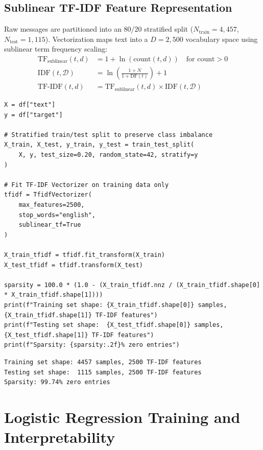 \documentclass[12pt]{article}
\begin{document}
\subsection{Sublinear TF-IDF Feature Representation}
Raw messages are partitioned into an 80/20 stratified split ($N_{\text{train}} = 4,457$, $N_{\text{test}} = 1,115$). Vectorization maps text into a $D = 2,500$ vocabulary space using sublinear term frequency scaling:
\begin{align}
    \text{TF}_{\text{sublinear}}(t, d) &= 1 + \ln(\text{count}(t, d)) \quad \text{for } \text{count} > 0 \\
    \text{IDF}(t, \mathcal{D}) &= \ln\left( \frac{1 + N}{1 + \text{DF}(t)} \right) + 1 \\
    \text{TF-IDF}(t, d) &= \text{TF}_{\text{sublinear}}(t, d) \times \text{IDF}(t, \mathcal{D})
\end{align}

\begin{lstlisting}[style=code]
X = df["text"]
y = df["target"]

# Stratified train/test split to preserve class imbalance
X_train, X_test, y_train, y_test = train_test_split(
    X, y, test_size=0.20, random_state=42, stratify=y
)

# Fit TF-IDF Vectorizer on training data only
tfidf = TfidfVectorizer(
    max_features=2500,
    stop_words="english",
    sublinear_tf=True
)

X_train_tfidf = tfidf.fit_transform(X_train)
X_test_tfidf = tfidf.transform(X_test)

sparsity = 100.0 * (1.0 - (X_train_tfidf.nnz / (X_train_tfidf.shape[0] * X_train_tfidf.shape[1])))
print(f"Training set shape: {X_train_tfidf.shape[0]} samples, {X_train_tfidf.shape[1]} TF-IDF features")
print(f"Testing set shape:  {X_test_tfidf.shape[0]} samples, {X_test_tfidf.shape[1]} TF-IDF features")
print(f"Sparsity: {sparsity:.2f}% zero entries")
\end{lstlisting}

\begin{lstlisting}[style=output]
Training set shape: 4457 samples, 2500 TF-IDF features
Testing set shape:  1115 samples, 2500 TF-IDF features
Sparsity: 99.74% zero entries
\end{lstlisting}

\newpage
\section{Logistic Regression Training and Interpretability}
\end{document}
